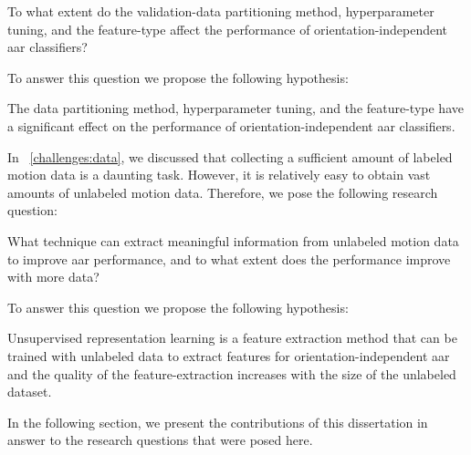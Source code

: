 \begin{ResearchQuestion}
\label{rq:aar_analysis}
  To what extent do the validation-data partitioning method, hyperparameter tuning, and the feature-type affect the performance of orientation-independent \gls{aar} classifiers?
   
    
\end{ResearchQuestion}

To answer this question we propose the following hypothesis:

\begin{hypothesis}
\label{hyp:aar_analysis}
    The data partitioning method, hyperparameter tuning, and the feature-type have a significant effect on the performance of orientation-independent \gls{aar} classifiers.
\end{hypothesis}

In \sectionname~\ref{challenges:data}, we discussed that collecting a sufficient amount of labeled motion data is a daunting task. However, it is relatively easy to obtain vast amounts of unlabeled motion data.
Therefore, we pose the following research question:

\begin{ResearchQuestion}
\label{rq:deep_unsupervised}
    What technique can extract meaningful information from unlabeled motion data to improve \gls{aar} performance, and to what extent does the performance improve with more data?
\end{ResearchQuestion}

To answer this question we propose the following hypothesis:

\begin{hypothesis}
\label{hyp:deep_unsupervised}
    Unsupervised representation learning is a feature extraction method that can be trained with unlabeled data to extract features for orientation-independent \gls{aar} and the quality of the feature-extraction increases with the size of the unlabeled dataset.
\end{hypothesis}


In the following section, we present the contributions of this dissertation in answer to the research questions that were posed here.









